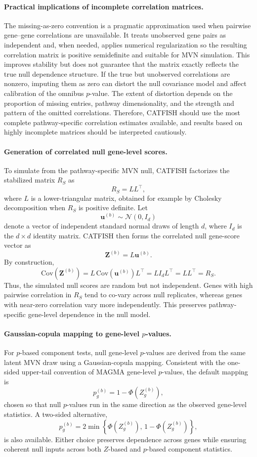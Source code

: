 \documentclass[unnumsec,webpdf,contemporary,large]{oup-authoring-template}%
\theoremstyle{thmstyleone}%
\theoremstyle{thmstyletwo}%
\theoremstyle{thmstylethree}%
\begin{document}
\begin{appendices}
\paragraph{Practical implications of incomplete correlation matrices.}
The missing-as-zero convention is a pragmatic approximation used when pairwise gene--gene correlations are unavailable. It treats unobserved gene pairs as independent and, when needed, applies numerical regularization so the resulting correlation matrix is positive semidefinite and suitable for MVN simulation. This improves stability but does not guarantee that the matrix exactly reflects the true null dependence structure. If the true but unobserved correlations are nonzero, imputing them as zero can distort the null covariance model and affect calibration of the omnibus $p$-value. The extent of distortion depends on the proportion of missing entries, pathway dimensionality, and the strength and pattern of the omitted correlations. Therefore, CATFISH should use the most complete pathway-specific correlation estimates available, and results based on highly incomplete matrices should be interpreted cautiously.

\paragraph{Generation of correlated null gene-level scores.}
To simulate from the pathway-specific MVN null, CATFISH factorizes the stabilized matrix $R_S$ as
\[
R_S=LL^\top,
\]
where $L$ is a lower-triangular matrix, obtained for example by Cholesky decomposition when $R_S$ is positive definite. Let
\[
\mathbf{u}^{(b)}
\sim
\mathcal{N}(0,I_d)
\]
denote a vector of independent standard normal draws of length $d$, where $I_d$ is the $d\times d$ identity matrix. CATFISH then forms the correlated null gene-score vector as
\[
\mathbf{Z}^{(b)}=L\mathbf{u}^{(b)}.
\]
By construction,
\[
\mathrm{Cov}\!\left(\mathbf{Z}^{(b)}\right)
=
L\,\mathrm{Cov}\!\left(\mathbf{u}^{(b)}\right)L^\top
=
LI_dL^\top
=
LL^\top
=
R_S.
\]
Thus, the simulated null scores are random but not independent. Genes with high pairwise correlation in $R_S$ tend to co-vary across null replicates, whereas genes with near-zero correlation vary more independently. This preserves pathway-specific gene-level dependence in the null model.

\paragraph{Gaussian-copula mapping to gene-level $p$-values.}
For $p$-based component tests, null gene-level $p$-values are derived from the same latent MVN draw using a Gaussian-copula mapping. Consistent with the one-sided upper-tail convention of MAGMA gene-level $p$-values, the default mapping is
\[
p_g^{(b)}
=
1-\Phi\!\left(Z_g^{(b)}\right),
\]
chosen so that null $p$-values run in the same direction as the observed gene-level statistics. A two-sided alternative,
\[
p_g^{(b)}
=
2\min\left\{\Phi(Z_g^{(b)}),\,1-\Phi(Z_g^{(b)})\right\},
\]
is also available. Either choice preserves dependence across genes while ensuring coherent null inputs across both $Z$-based and $p$-based component statistics.


\end{appendices}
\end{document}
